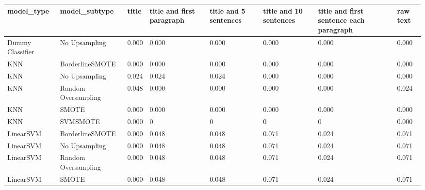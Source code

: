 \begin{tabular}{llllllll}
\toprule
                  model\_type &       model\_subtype & title & title and first paragraph & title and 5 sentences & title and 10 sentences & title and first sentence each paragraph &  raw text \\
\midrule
            Dummy Classifier &       No Upsampling & 0.000 &                     0.000 &                 0.000 &                  0.000 &                                   0.000 &     0.000 \\
                         KNN &     BorderlineSMOTE & 0.000 &                     0.000 &                 0.000 &                  0.000 &                                   0.000 &     0.000 \\
                         KNN &       No Upsampling & 0.024 &                     0.024 &                 0.024 &                  0.000 &                                   0.000 &     0.000 \\
                         KNN & Random Oversampling & 0.048 &                     0.000 &                 0.000 &                  0.000 &                                   0.000 &     0.024 \\
                         KNN &               SMOTE & 0.000 &                     0.000 &                 0.000 &                  0.000 &                                   0.000 &     0.000 \\
                         KNN &            SVMSMOTE & 0.000 &                         0 &                     0 &                      0 &                                       0 &     0.000 \\
                   LinearSVM &     BorderlineSMOTE & 0.000 &                     0.048 &                 0.048 &                  0.071 &                                   0.024 &     0.071 \\
                   LinearSVM &       No Upsampling & 0.000 &                     0.048 &                 0.048 &                  0.071 &                                   0.024 &     0.071 \\
                   LinearSVM & Random Oversampling & 0.000 &                     0.048 &                 0.048 &                  0.071 &                                   0.024 &     0.071 \\
                   LinearSVM &               SMOTE & 0.000 &                     0.048 &                 0.048 &                  0.071 &                                   0.024 &     0.071 \\

\end{tabular}
